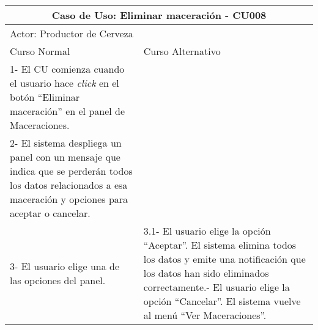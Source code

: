     \begin{table}[H]
    \begin{center}
    \begin{tabularx}{\textwidth}{ | X | X |}
        \hline
        \multicolumn{2}{|c|}{\textbf{Caso de Uso: Eliminar maceración - CU008}} \\
        \hline
        \multicolumn{2}{|l|}{Actor: Productor de Cerveza} \\
        \hline
        Curso Normal & Curso Alternativo \\
        \hline
        1- El CU comienza cuando el usuario hace \textit{click} en el botón “Eliminar maceración” en el panel de Maceraciones. & \\
        \hline
        2- El sistema despliega un panel con un mensaje que indica que se perderán todos los datos relacionados a esa maceración y opciones para aceptar o cancelar. &
        \\
        \hline
        3- El usuario elige una de las opciones del panel. & 3.1- El usuario elige la opción “Aceptar”. El sistema elimina todos los datos y emite una notificación que los datos han sido eliminados correctamente.\newline
        3.2- El usuario elige la opción “Cancelar”. El sistema vuelve al menú “Ver Maceraciones”.
        \\
        \hline
    \end{tabularx}
    \label{CU008}
    \end{center}
    \end{table}
    
